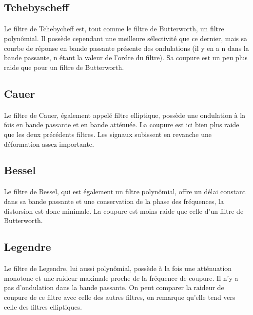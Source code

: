 \documentclass[a4paper,11pt]{article}
\begin{document}
    \subsection{Tchebyscheff}
        \paragraph{}
Le filtre de Tchebycheff est, tout comme le filtre de Butterworth, un filtre polynômial.
Il possède cependant une meilleure sélectivité que ce dernier, mais sa courbe de réponse en bande passante présente des ondulations (il y en a n dans la bande passante, n étant la valeur de l'ordre du filtre).
Sa coupure est un peu plus raide que pour un filtre de Butterworth.

    \subsection{Cauer}
        \paragraph{}
Le filtre de Cauer, également appelé filtre elliptique, possède une ondulation à la fois en bande passante et en bande atténuée.
La coupure est ici bien plus raide que les deux précédents filtres.
Les signaux subissent en revanche une déformation assez importante.

    \subsection{Bessel}
        \paragraph{}
Le filtre de Bessel, qui est également un filtre polynômial, offre un délai constant dans sa bande passante et une conservation de la phase des fréquences, la distorsion est donc minimale.
La coupure est moins raide que celle d’un filtre de Butterworth.

    \subsection{Legendre}
        \paragraph{}
Le filtre de Legendre, lui aussi polynômial, possède à la fois une atténuation monotone et une raideur maximale proche de la fréquence de coupure.
Il n’y a pas d’ondulation dans la bande passante.
On peut comparer la  raideur de coupure de ce filtre avec celle des autres filtres, on remarque qu’elle tend vers celle des filtres elliptiques.
\end{document}
